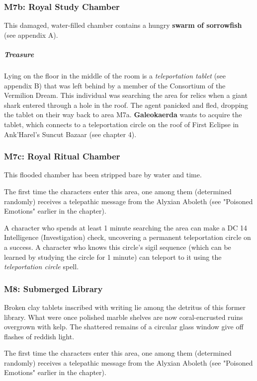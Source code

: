 \documentclass[10pt,a4paper,twoside,bg=print,twocolumn,openany,nodeprecatedcode]{dndbook}
\begin{document}
\subsubsection{M7b: Royal Study Chamber}
This damaged, water-filled chamber contains a hungry \textbf{swarm of sorrowfish} (see appendix A).

\subparagraph{Treasure}
Lying on the floor in the middle of the room is a \textit{teleportation tablet} (see appendix B) that was left behind by a member of the Consortium of the Vermilion Dream. This individual was searching the area for relics when a giant shark entered through a hole in the roof. The agent panicked and fled, dropping the tablet on their way back to area M7a. \textbf{Galeokaerda} wants to acquire the tablet, which connects to a teleportation circle on the roof of First Eclipse in Ank'Harel's Suncut Bazaar (see chapter 4).

\subsubsection{M7c: Royal Ritual Chamber}
This flooded chamber has been stripped bare by water and time.

The first time the characters enter this area, one among them (determined randomly) receives a telepathic message from the Alyxian Aboleth (see "Poisoned Emotions" earlier in the chapter).

A character who spends at least 1 minute searching the area can make a DC 14 Intelligence (Investigation) check, uncovering a permanent teleportation circle on a success. A character who knows this circle's sigil sequence (which can be learned by studying the circle for 1 minute) can teleport to it using the \textit{teleportation circle} spell.

\subsubsection{M8: Submerged Library}
\begin{DndReadAloud}{}
Broken clay tablets inscribed with writing lie among the detritus of this former library. What were once polished marble shelves are now coral-encrusted ruins overgrown with kelp. The shattered remains of a circular glass window give off flashes of reddish light.

\end{DndReadAloud}

The first time the characters enter this area, one among them (determined randomly) receives a telepathic message from the Alyxian Aboleth (see "Poisoned Emotions" earlier in the chapter).
\end{document}
